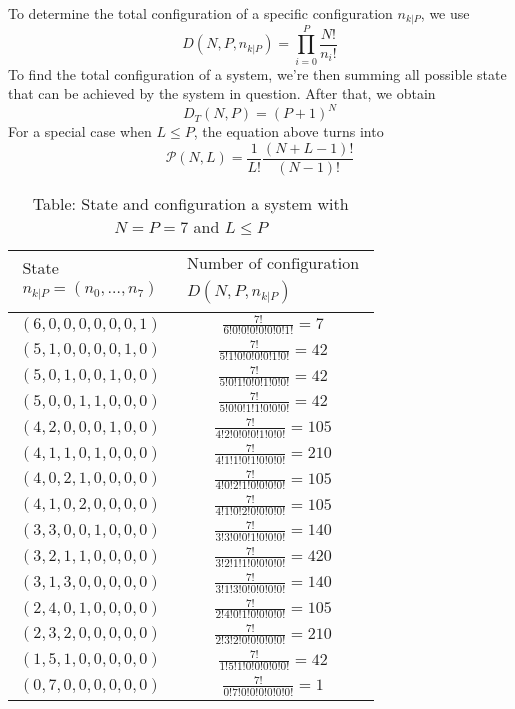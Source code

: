 \documentclass[../../../Main.tex]{subfiles}
\begin{document}
To determine the total configuration of a specific configuration $n_{k|P}$, we use
\begin{equation*}
    D(N,P,n_{k|P})=\prod_{i=0}^{P}\frac{N!}{n_i!}
\end{equation*}
To find the total configuration of a system, we're then summing all possible state that can be achieved by the system in question. After that, we obtain
\begin{equation*}
    D_T(N,P)=(P+1)^N
\end{equation*}
For a special case when $L\leq P$, the equation above turns into
\begin{equation*}
\mathcal{P}(N,L)=\frac{1}{L!}\frac{(N+L-1)!}{(N-1)!}
\end{equation*}
\begin{table}[h]
    \centering
    \caption*{Table: State and configuration a system with $N=P=7$ and $L\leq P$}
    \begin{tabular}{cc} 
        \toprule
        $\begin{array}{c}\text{State} \\n_{k|P}=(n_0,\dots, n_7)\end{array}$&$\begin{array}{c}\text{Number of configuration}\\  D(N,P,n_{k|P})\end{array}$\\
        \midrule
        $(6, 0, 0, 0, 0, 0, 0, 1)$&$\frac{7!}{6!0!0!0!0!0!0!1!} =7 $ \\
        $(5, 1, 0, 0, 0, 0, 1, 0)$&$\frac{7!}{5!1!0!0!0!0!1!0!} =42 $ \\
        $(5, 0, 1, 0, 0, 1, 0, 0)$&$\frac{7!}{5!0!1!0!0!1!0!0!} =42$\\
        $(5, 0, 0, 1, 1, 0, 0, 0)$&$\frac{7!}{5!0!0!1!1!0!0!0!} =42 $\\
        $(4, 2, 0, 0, 0, 1, 0, 0)$&$\frac{7!}{4!2!0!0!0!1!0!0!} =105$\\
        $(4, 1, 1, 0, 1, 0, 0, 0)$&$\frac{7!}{4!1!1!0!1!0!0!0!} =210 $\\
        $(4, 0, 2, 1, 0, 0, 0, 0)$&$\frac{7!}{4!0!2!1!0!0!0!0!} =105 $\\
        $(4, 1, 0, 2, 0, 0, 0, 0)$&$\frac{7!}{4!1!0!2!0!0!0!0!} =105 $\\
        $(3, 3, 0, 0, 1, 0, 0, 0)$&$\frac{7!}{3!3!0!0!1!0!0!0!} =140 $\\
        $(3, 2, 1, 1, 0, 0, 0, 0)$&$\frac{7!}{ 3!2!1!1!0!0!0!0!} =420 $\\
        $(3, 1, 3, 0, 0, 0, 0, 0)$&$\frac{7!}{3!1!3!0!0!0!0!0!} =140 $\\
        $(2, 4, 0, 1, 0, 0, 0, 0)$&$\frac{7!}{2!4!0!1!0!0!0!0!} =105 $\\
        $(2, 3, 2, 0, 0, 0, 0, 0)$&$\frac{7!}{2!3!2!0!0!0!0!0!} =210 $\\
        $(1, 5, 1, 0, 0, 0, 0, 0)$&$\frac{7!}{1!5!1!0!0!0!0!0!} =42 $\\
        $(0, 7, 0, 0, 0, 0, 0, 0)$&$\frac{7!}{0!7!0!0!0!0!0!0!} =1 $\\
        \bottomrule
    \end{tabular}
\end{table}
\end{document}
